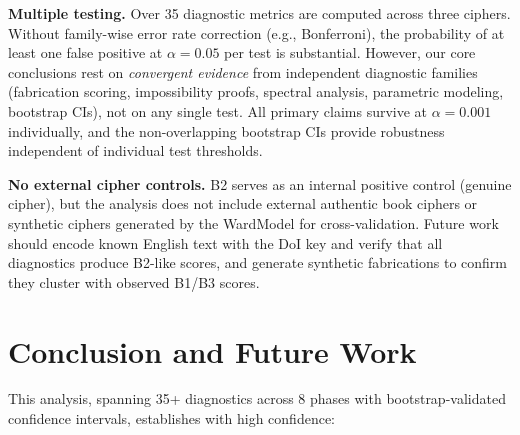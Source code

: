 \documentclass[11pt,a4paper]{article}
\begin{document}
\textbf{Multiple testing.}
Over 35 diagnostic metrics are computed across three ciphers. Without
family-wise error rate correction (e.g., Bonferroni), the probability of
at least one false positive at $\alpha{=}0.05$ per test is substantial.
However, our core conclusions rest on \emph{convergent evidence} from
independent diagnostic families (fabrication scoring, impossibility proofs,
spectral analysis, parametric modeling, bootstrap CIs), not on any single
test. All primary claims survive at $\alpha{=}0.001$ individually, and the
non-overlapping bootstrap CIs provide robustness independent of
individual test thresholds.

\textbf{No external cipher controls.}
B2 serves as an internal positive control (genuine cipher), but the
analysis does not include external authentic book ciphers or synthetic
ciphers generated by the WardModel for cross-validation. Future work
should encode known English text with the DoI key and verify that all
diagnostics produce B2-like scores, and generate synthetic fabrications
to confirm they cluster with observed B1/B3 scores.

\section{Conclusion and Future Work}

This analysis, spanning 35+ diagnostics across 8 phases with bootstrap-validated
confidence intervals, establishes with high confidence:
\end{document}
